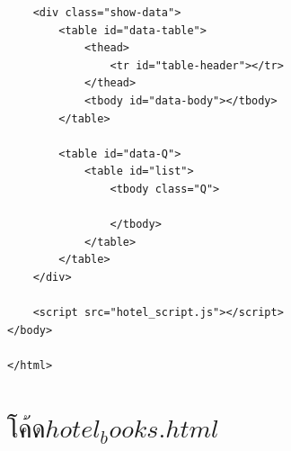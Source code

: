 \documentclass{report}
\begin{document}
\begin{verbatim}
    <div class="show-data">
        <table id="data-table">
            <thead>
                <tr id="table-header"></tr>
            </thead>
            <tbody id="data-body"></tbody>
        </table>

        <table id="data-Q">
            <table id="list">
                <tbody class="Q">
        
                </tbody>
            </table>
        </table>
    </div>

    <script src="hotel_script.js"></script>
</body>

</html>
\end{verbatim}

\section{$โค้ดhotel_books.html$}
\end{document}
